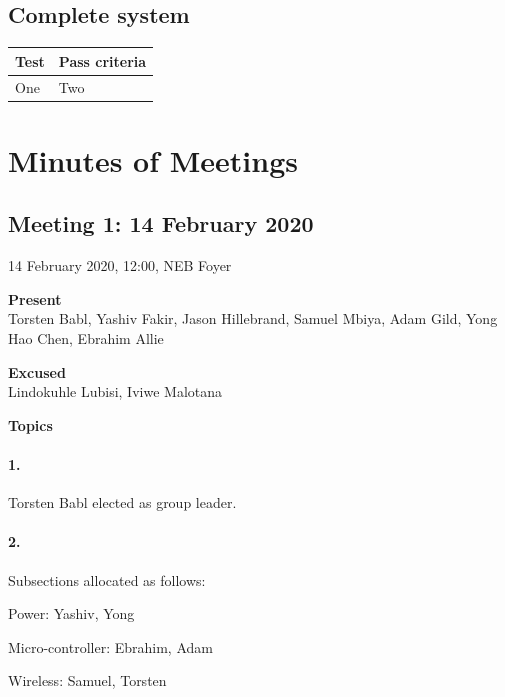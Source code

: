 \documentclass[12pt]{article}
\begin{document}
\subsection{Complete system}
\begin{center}
  \begin{table}[!htb]
    
    \hskip-2.2cm\begin{tabular}{|p{8cm}|p{10cm}|}
        \hline
        \textbf{Test} & \textbf{Pass criteria} \\
        \hline

        One & Two \\

        \hline

      \end{tabular}    
      
      \label{tab:summary_measurments}
     \end{table}
  \end{center}

\newpage
\section{Minutes of Meetings}
\subsection{Meeting 1: 14 February 2020}
14 February 2020, 12:00, NEB Foyer

\textbf{Present}\\
Torsten Babl, Yashiv Fakir, Jason Hillebrand, Samuel Mbiya, Adam Gild, Yong Hao Chen, Ebrahim Allie

\textbf{Excused}\\
Lindokuhle Lubisi, Iviwe Malotana

\textbf{Topics}
\paragraph[short]{1.} Torsten Babl elected as group leader.
\paragraph[short]{2.} Subsections allocated as follows:

Power: Yashiv, Yong

Micro-controller:	Ebrahim, Adam

Wireless:	Samuel,	Torsten
\end{document}
